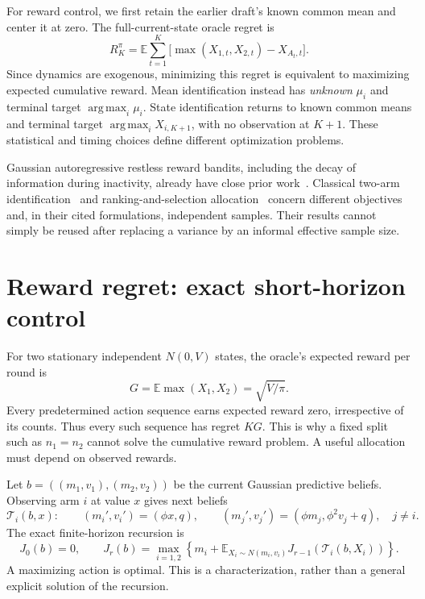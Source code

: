 \documentclass[11pt]{article}
\newcommand{\E}{\mathbb E}
\newcommand{\argmax}{\operatorname*{arg\,max}}
\begin{document}
For reward control, we first retain the earlier draft's known common mean and center it at zero. The full-current-state oracle regret is
\begin{equation}
R_K^\pi=\E\sum_{t=1}^K\bigl[\max(X_{1,t},X_{2,t})-X_{A_t,t}\bigr].
\label{eq:regret}
\end{equation}
Since dynamics are exogenous, minimizing this regret is equivalent to maximizing expected cumulative reward. Mean identification instead has \emph{unknown} $\mu_i$ and terminal target $\argmax_i\mu_i$. State identification returns to known common means and terminal target $\argmax_iX_{i,K+1}$, with no observation at $K+1$. These statistical and timing choices define different optimization problems.

Gaussian autoregressive restless reward bandits, including the decay of information during inactivity, already have close prior work~\cite{kuhn2015}. Classical two-arm identification~\cite{kaufmann2016} and ranking-and-selection allocation~\cite{glynn2004} concern different objectives and, in their cited formulations, independent samples. Their results cannot simply be reused after replacing a variance by an informal effective sample size.

\section{Reward regret: exact short-horizon control}
For two stationary independent $N(0,V)$ states, the oracle's expected reward per round is
\begin{equation}
G=\E\max(X_1,X_2)=\sqrt{V/\pi}.
\label{eq:G}
\end{equation}
Every predetermined action sequence earns expected reward zero, irrespective of its counts. Thus every such sequence has regret $KG$. This is why a fixed split such as $n_1=n_2$ cannot solve the cumulative reward problem. A useful allocation must depend on observed rewards.

Let $b=((m_1,v_1),(m_2,v_2))$ be the current Gaussian predictive beliefs. Observing arm $i$ at value $x$ gives next beliefs
\begin{equation}
\mathcal T_i(b,x):\qquad
(m_i',v_i')=(\phi x,q),\qquad
(m_j',v_j')=(\phi m_j,\phi^2v_j+q),\quad j\ne i.
\end{equation}
The exact finite-horizon recursion is
\begin{equation}
J_0(b)=0,\qquad
J_r(b)=\max_{i=1,2}\left\{m_i+
\E_{X_i\sim N(m_i,v_i)}J_{r-1}(\mathcal T_i(b,X_i))\right\}.
\label{eq:bellman}
\end{equation}
A maximizing action is optimal. This is a characterization, rather than a general explicit solution of the recursion.
\end{document}
